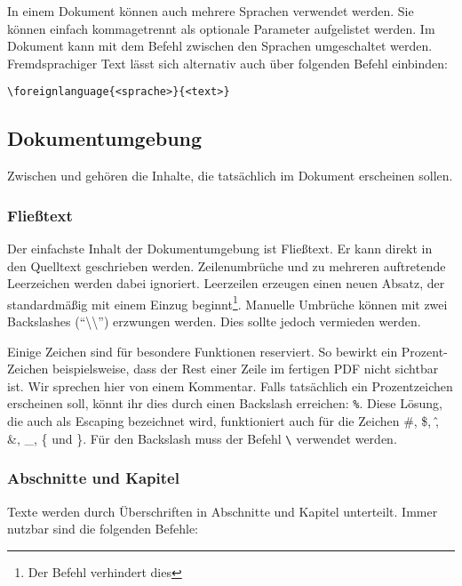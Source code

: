 In einem Dokument können auch mehrere Sprachen verwendet werden.
Sie können einfach kommagetrennt als optionale Parameter aufgelistet werden.
Im Dokument kann mit dem Befehl \texttt{} zwischen den Sprachen umgeschaltet werden.
Fremdsprachiger Text lässt sich alternativ auch über folgenden Befehl einbinden: 
\begin{verbatim}
\foreignlanguage{<sprache>}{<text>}
\end{verbatim}

\subsection{Dokumentumgebung}

Zwischen \texttt{} und \texttt{} gehören die Inhalte, die tatsächlich im Dokument erscheinen sollen.

\subsubsection{Fließtext}
Der einfachste Inhalt der Dokumentumgebung ist Fließtext.
Er kann direkt in den Quelltext geschrieben werden.
Zeilenumbrüche und zu mehreren auftretende Leerzeichen werden dabei ignoriert.
Leerzeilen erzeugen einen neuen Absatz, der standardmäßig mit einem Einzug beginnt\footnote{Der Befehl \texttt{\noindent} verhindert dies}.
Manuelle Umbrüche können mit zwei Backslashes (\enquote{\textbackslash\textbackslash}) erzwungen werden.
Dies sollte jedoch vermieden werden.

Einige Zeichen sind für besondere Funktionen reserviert. 
So bewirkt ein Prozent-Zeichen beispielsweise, dass der Rest einer Zeile im fertigen PDF nicht sichtbar ist.
Wir sprechen hier von einem Kommentar.
Falls tatsächlich ein Prozentzeichen erscheinen soll, könnt ihr dies durch einen Backslash erreichen: \texttt{\%}.
Diese Lösung, die auch als Escaping bezeichnet wird, funktioniert auch für die Zeichen \#, \$, \^, \&, \_, \{ und \}.
Für den Backslash muss der Befehl \texttt{\textbackslash} verwendet werden.

\subsubsection{Abschnitte und Kapitel}
Texte werden durch Überschriften in Abschnitte und Kapitel unterteilt.
Immer nutzbar sind die folgenden Befehle:

